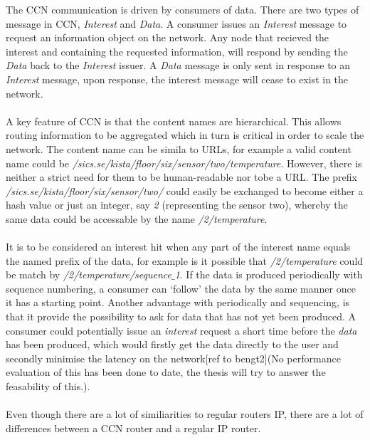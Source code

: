 The CCN communication \cite{Jacobson2009} is driven by consumers of data. There are two types of message in CCN, \textit{Interest} and \textit{Data}. A consumer issues an \textit{Interest} message to request an information object on the network. Any node that recieved the interest and containing the requested information, will respond by sending the \textit{Data} back to the \textit{Interest} issuer. A \textit{Data} message is only sent in response to an \textit{Interest} message, upon response, the interest message will cease to exist in the network.
\\\\
A key feature of CCN is that the content names are hierarchical. This allows routing information to be aggregated which in turn is critical in order to scale the network. The content name can be simila to URLs, for example a valid content name could be \textit{/sics.se/kista/floor/six/sensor/two/temperature}. However, there is neither a strict need for them to be human-readable nor tobe a URL. The prefix \textit{/sics.se/kista/floor/six/sensor/two/} could easily be exchanged to become either a hash value or just an integer, say \textit{2} (representing the sensor two), whereby the same data could be accessable by the name \textit{/2/temperature}.
\\\\
It is to be considered an interest hit when any part of the interest name equals the named prefix of the data, for example is it possible that \textit{/2/temperature} could be match by \textit{/2/temperature/sequence$\_$1}. If the data is produced periodically with sequence numbering, a consumer can `follow' the data by the same manner once it has a starting point. Another advantage with periodically and sequencing, is that it provide the possibility to ask for data that has not yet been produced. A consumer could potentially issue an \textit{interest} request a short time before the \textit{data} has been produced, which would firstly get the data directly to the user and secondly minimise the latency on the network[ref to bengt2](No performance evaluation of this has been done to date, the thesis will try to answer the feasability of this.). 
\\\\
Even though there are a lot of similiarities to regular routers IP, there are a lot of differences between a CCN router and a regular IP router.
